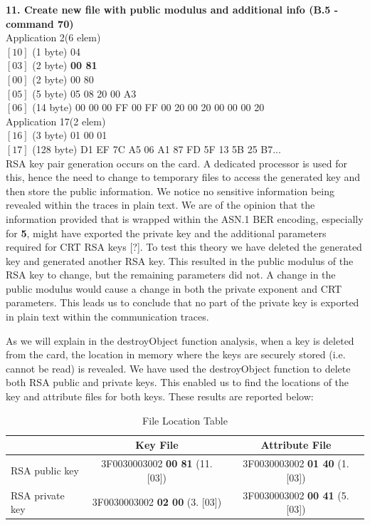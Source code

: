 \documentclass[bsc,frontabs,twoside,singlespacing,parskip,deptreport]{infthesis}     %
\begin{document}
\textbf{11. Create new file with public modulus and additional info (B.5 - command 70)}\\
Application 2(6 elem)\\
$[10]$ (1 byte) 04\\
$[03]$ (2 byte) \textbf{00 81}\\
$[00]$ (2 byte) 00 80\\
$[05]$ (5 byte) 05 08 20 00 A3\\
$[06]$ (14 byte) 00 00 00 FF 00 FF 00 20 00 20 00 00 00 20\\
Application 17(2 elem)\\
$[16]$ (3 byte) 01 00 01\\
$[17]$ (128 byte) D1 EF 7C A5 06 A1 87 FD 5F 13 5B 25 B7...\\

RSA key pair generation occurs on the card. A dedicated processor is used for this, hence the need to change to temporary files to access the generated key and then store the public information. We notice no sensitive information being revealed within the traces in plain text. We are of the opinion that the information provided that is wrapped within the ASN.1 BER encoding, especially for \textbf{5}, might have exported the private key and the additional parameters required for CRT RSA keys [?]. To test this theory we have deleted the generated key and generated another RSA key. This resulted in the public modulus of the RSA key to change, but the remaining parameters did not. A change in the public modulus would cause a change in both the private exponent and CRT parameters. This leads us to conclude that no part of the private key is exported in plain text within the communication traces.

As we will explain in the destroyObject function analysis, when a key is deleted from the card, the location in memory where the keys are securely stored (i.e. cannot be read) is revealed. We have used the destroyObject function to delete both RSA public and private keys. This enabled us to find the locations of the key and attribute files for both keys. These results are reported below:

\begin{table}[H]
\begin{tabular}{|l|c|c|}
\hline
 & Key File & Attribute File\\
\hline
RSA public key & 3F0030003002 \textbf{00 81} (11. [03]) & 3F0030003002 \textbf{01 40} (1. [03])\\
\hline
RSA private key & 3F0030003002 \textbf{02 00} (3. [03]) & 3F0030003002 \textbf{00 41} (5. [03])\\
\hline
\end{tabular}
\caption{File Location Table}
\end{table}
\end{document}
